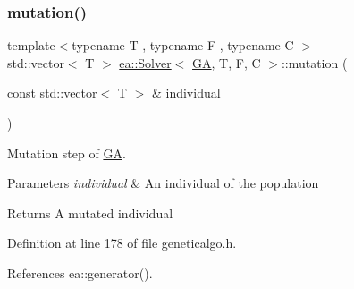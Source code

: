 \subsubsection{\texorpdfstring{mutation()}{mutation()}}
{\footnotesize\ttfamily template$<$typename T , typename F , typename C $>$ \\
std\+::vector$<$ T $>$ \hyperlink{classea_1_1_solver}{ea\+::\+Solver}$<$ \hyperlink{structea_1_1_g_a}{GA}, T, F, C $>$\+::mutation (\begin{DoxyParamCaption}\item[{const std\+::vector$<$ T $>$ \&}]{individual }\end{DoxyParamCaption})\hspace{0.3cm}{\ttfamily [private]}}



Mutation step of \hyperlink{structea_1_1_g_a}{GA}. 


\begin{DoxyParams}{Parameters}
{\em individual} & An individual of the population \\
\hline
\end{DoxyParams}
\begin{DoxyReturn}{Returns}
A mutated individual 
\end{DoxyReturn}


Definition at line 178 of file geneticalgo.\+h.



References ea\+::generator().


